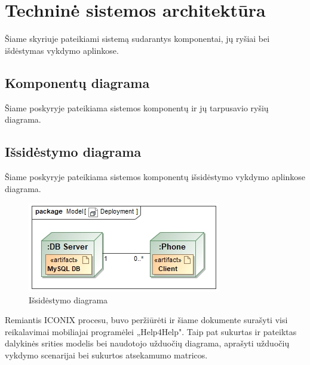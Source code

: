 \documentclass{VUMIFPSbakalaurinis}
\begin{document}
\section{Techninė sistemos architektūra}
Šiame skyriuje pateikiami sistemą sudarantys komponentai, jų ryšiai bei išdėstymas vykdymo aplinkose.

\subsection{Komponentų diagrama}
Šiame poskyryje pateikiama sistemos komponentų ir jų tarpusavio ryšių diagrama.

\subsection{Išsidėstymo diagrama}
Šiame poskyryje pateikiama sistemos komponentų išsidėstymo vykdymo aplinkose diagrama.
\begin{figure}[h]
	\centering
	\includegraphics[scale=0.7]{img/Deployment}
	\caption{Išsidėstymo diagrama}
	\label{img:deployment}
\end{figure}

Remiantis ICONIX procesu, buvo peržiūrėti ir šiame dokumente surašyti visi reikalavimai mobiliajai programėlei „Help4Help". Taip pat sukurtas ir pateiktas dalykinės srities modelis bei naudotojo užduočių diagrama, aprašyti užduočių vykdymo scenarijai bei sukurtos atsekamumo matricos.

\printbibliography[heading=bibintoc]  %

\appendix
\end{document}
